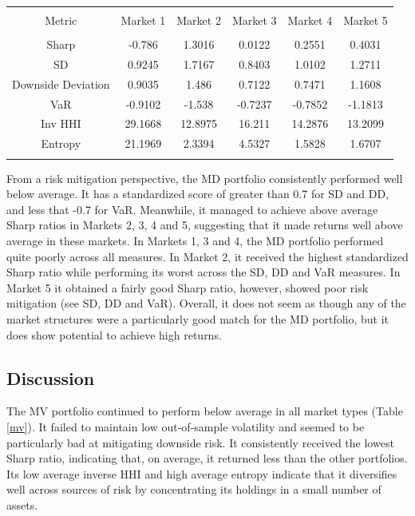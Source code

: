 \documentclass[11pt,preprint, authoryear]{elsarticle}
\let\origtable\table
\let\endorigtable\endtable
\renewenvironment{table}[1][2] {
    \expandafter\origtable\expandafter[H]
} {
    \endorigtable
}
\numberwithin{equation}{section}
\numberwithin{figure}{section}
\numberwithin{table}{section}
\begin{document}
\begin{table}[!htbp] \centering 
  \caption{Maximum Diversification} 
  \label{md} 
\begin{tabular}{@{\extracolsep{5pt}} cccccc} 
\\[-1.8ex]\hline 
\hline \\[-1.8ex] 
Metric & Market 1 & Market 2 & Market 3 & Market 4 & Market 5 \\ 
\hline \\[-1.8ex] 
Sharp & -0.786 & 1.3016 & 0.0122 & 0.2551 & 0.4031 \\ 
SD & 0.9245 & 1.7167 & 0.8403 & 1.0102 & 1.2711 \\ 
Downside Deviation & 0.9035 & 1.486 & 0.7122 & 0.7471 & 1.1608 \\ 
VaR & -0.9102 & -1.538 & -0.7237 & -0.7852 & -1.1813 \\ 
Inv HHI & 29.1668 & 12.8975 & 16.211 & 14.2876 & 13.2099 \\ 
Entropy & 21.1969 & 2.3394 & 4.5327 & 1.5828 & 1.6707 \\ 
\hline \\[-1.8ex] 
\end{tabular} 
\end{table}

From a risk mitigation perspective, the MD portfolio consistently
performed well below average. It has a standardized score of greater
than 0.7 for SD and DD, and less that -0.7 for VaR. Meanwhile, it
managed to achieve above average Sharp ratios in Markets 2, 3, 4 and 5,
suggesting that it made returns well above average in these markets. In
Markets 1, 3 and 4, the MD portfolio performed quite poorly across all
measures. In Market 2, it received the highest standardized Sharp ratio
while performing its worst across the SD, DD and VaR measures. In Market
5 it obtained a fairly good Sharp ratio, however, showed poor risk
mitigation (see SD, DD and VaR). Overall, it does not seem as though any
of the market structures were a particularly good match for the MD
portfolio, but it does show potential to achieve high returns.

\hypertarget{discussion}{%
\subsection{Discussion}\label{discussion}}

The MV portfolio continued to perform below average in all market types
(Table \ref{mv}). It failed to maintain low out-of-sample volatility and
seemed to be particularly bad at mitigating downside risk. It
consistently received the lowest Sharp ratio, indicating that, on
average, it returned less than the other portfolios. Its low average
inverse HHI and high average entropy indicate that it diversifies well
across sources of risk by concentrating its holdings in a small number
of assets.
\end{document}
